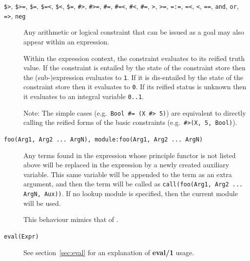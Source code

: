 \begin{description}
\item[\texttt{\$>}, \texttt{\$>=}, \texttt{\$=}, \texttt{\$=<}, \texttt{\$<}, \texttt{\$\bsl=},
    \texttt{\#>}, \texttt{\#>=}, \texttt{\#=}, \texttt{\#=<}, \texttt{\#<},
    \texttt{\#\bsl=},
    \texttt{>}, \texttt{>=}, \texttt{=:=}, \texttt{=<}, \texttt{<}, \texttt{=\bsl=},
    \texttt{and}, \texttt{or}, \texttt{=>}, \texttt{neg}]
    Any arithmetic or logical constraint that can be issued as a
    goal may also appear within an expression.

    Within the expression context, the constraint evaluates to its
    reified truth value.  If the constraint is entailed by the
    state of the constraint store then the (sub-)expression
    evaluates to \verb|1|.  If it is dis-entailed by the state of
    the constraint store then it evaluates to \verb|0|. If its
    reified status is unknown then it evaluates to an integral
    variable \verb|0..1|.

    Note: The simple cases (e.g.\ \verb|Bool #= (X #> 5)|) are
    equivalent to directly calling the reified forms of the basic
    constraints (e.g.\ \verb|#>(X, 5, Bool)|).

\item[\texttt{foo(Arg1, Arg2 ... ArgN), module:foo(Arg1, Arg2 ... ArgN)}]
    Any terms found in the expression whose principle functor is
    not listed above will be replaced in the expression by a newly
    created auxiliary variable. This same variable will be
    appended to the term as an extra argument, and then the term
    will be called as \verb|call(foo(Arg1, Arg2 ... ArgN, Aux))|.
    If no lookup module is specified, then the current
    module will be used.

    This behaviour mimics that of
    .

\item[\texttt{eval(Expr)}]
    See section~\ref{sec:eval} for an explanation of {\bf eval/1} usage.
\end{description}

